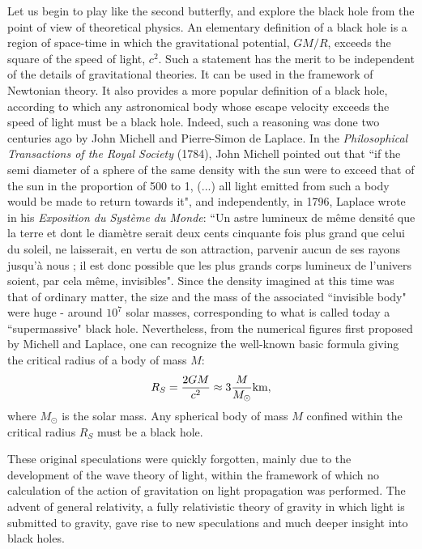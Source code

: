 \documentclass[12pt]{article}
\begin{document}
Let us begin to play like the second butterfly, and explore the black hole 
from  the point of view of theoretical physics.
An elementary definition of a black hole is a region of space-time in which
the gravitational potential, $GM/R$, exceeds the square of the speed of light,
$c^2$. Such a statement has the merit to be independent of the details of
gravitational theories. It can be used in the framework of Newtonian
theory. It also provides a more popular definition of a black
hole, according to which any astronomical body whose
escape velocity exceeds the speed of light must be a black hole.
Indeed, such a reasoning was done two centuries ago
by John Michell and Pierre-Simon de Laplace. In the {\it Philosophical
Transactions of the Royal Society} (1784), John Michell pointed out that ``if
the semi diameter of a sphere of the same density with the sun were to exceed
that of the sun in the proportion of 500 to 1, (...) all light emitted from
such a body would be made to return towards it", and independently, in 1796,
Laplace wrote in his {\it Exposition du Syst\`eme du Monde}: ``Un astre
lumineux de m\^eme densit\'e que la terre et dont le diam\`etre serait deux cents
cinquante fois plus grand que celui du soleil, ne laisserait, en vertu de son
attraction, parvenir aucun de ses rayons jusqu'\`a nous ; il est donc possible
que les plus grands corps lumineux de l'univers soient, par cela m\^eme,
invisibles".  Since the density imagined at this time was that of ordinary
matter, the size and the mass of the associated ``invisible body" were huge -
around $10^7$ solar masses, corresponding to what is called today a
``supermassive" black hole. Nevertheless, from the numerical figures first
proposed by Michell and Laplace, one can recognize the well-known basic
formula giving the critical radius of a body of mass $M$: 
\begin{equation}
R_S = {2 GM\over c^2} \approx 3 {M\over M_{\odot}} \textrm{km},     
\end{equation}
where $M_{\odot}$ is the solar mass. Any spherical body of mass $M$ confined 
within the critical radius $R_{S}$ must be a black hole.
 
These original speculations were quickly forgotten, mainly due to the
development of the wave theory of light, within the framework of which no
calculation of the action of gravitation on light propagation was performed.
The advent of general relativity, a fully relativistic
theory of gravity in which light is submitted to gravity, gave rise to new
speculations and much deeper insight into black holes.
\end{document}
